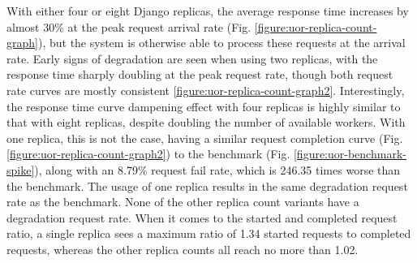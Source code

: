 With either four or eight Django replicas, the average response time increases by almost 30\% at the peak request arrival rate (Fig. \ref{figure:uor-replica-count-graph}), but the system is otherwise able to process these requests at the arrival rate. Early signs of degradation are seen when using two replicas, with the response time sharply doubling at the peak request rate, though both request rate curves are mostly consistent \ref{figure:uor-replica-count-graph2}. Interestingly, the response time curve dampening effect with four replicas is highly similar to that with eight replicas, despite doubling the number of available workers. With one replica, this is not the case, having a similar request completion curve (Fig. \ref{figure:uor-replica-count-graph2}) to the benchmark (Fig. \ref{figure:uor-benchmark-spike}), along with an 8.79\% request fail rate, which is 246.35 times worse than the benchmark. The usage of one replica results in the same degradation request rate as the benchmark. None of the other replica count variants have a degradation request rate. When it comes to the started and completed request ratio, a single replica sees a maximum ratio of 1.34 started requests to completed requests, whereas the other replica counts all reach no more than 1.02.

